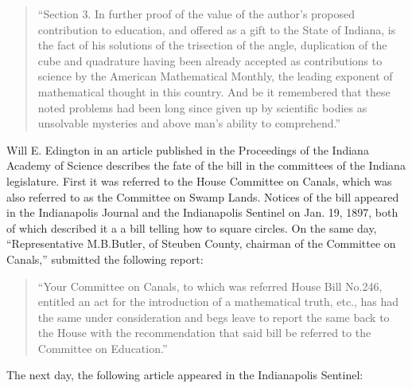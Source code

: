 \begin{quote}
  ``Section 3. In further proof of the value of the author's proposed
  contribution to education, and offered as a gift to the State of
  Indiana, is the fact of his solutions of the trisection of the angle,
  duplication of the cube and quadrature having been already accepted as
  contributions to science by the American Mathematical Monthly, the
  leading exponent of mathematical thought in this country. And be it
  remembered that these noted problems had been long since given up by
  scientific bodies as unsolvable mysteries and above man's ability to
  comprehend.''
\end{quote}

Will E. Edington in an article published in the Proceedings of the
Indiana Academy of Science describes the fate of the bill in the
committees of the Indiana legislature. First it was referred to the
House Committee on Canals, which was also referred to as the Committee
on Swamp Lands. Notices of the bill appeared in the Indianapolis Journal
and the Indianapolis Sentinel on Jan. 19, 1897, both of which described
it a a bill telling how to square circles. On the same day,
``Representative M.B.Butler, of Steuben County, chairman of the Committee
on Canals,'' submitted the following report:

\begin{quote}
  ``Your Committee on Canals, to which was referred House Bill No.246,
  entitled an act for the introduction of a mathematical truth, etc.,
  has had the same under consideration and begs leave to report the same
  back to the House with the recommendation that said bill be referred
  to the Committee on Education.''
\end{quote}

\noindent
The next day, the following article appeared in the Indianapolis
Sentinel:

